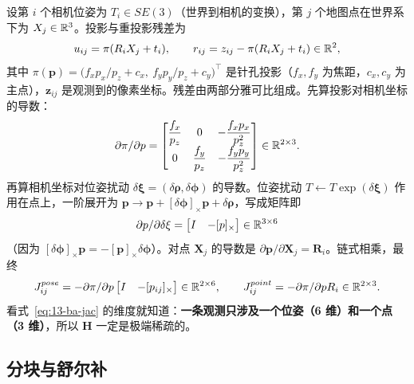 设第 $i$ 个相机位姿为 $T_i\in SE(3)$（世界到相机的变换），第 $j$ 个地图点在世界系下为 $X_j\in\mathbb{R}^{3}$。投影与重投影残差为
\begin{equation}
u_{ij}=\pi(R_iX_j+t_i),\qquad
r_{ij}=z_{ij}-\pi(R_iX_j+t_i)\in\mathbb{R}^{2},
\end{equation}
其中 $\pi(\bm{p})=\big(f_x p_x/p_z+c_x,\ f_y p_y/p_z+c_y\big)^{\top}$ 是针孔投影（$f_x,f_y$ 为焦距，$c_x,c_y$ 为主点），$\bm{z}_{ij}$ 是观测到的像素坐标。残差由两部分雅可比组成。先算投影对相机坐标的导数：
\begin{equation}
\partial\pi/\partial p=\begin{bmatrix}
\dfrac{f_x}{p_z}&0&-\dfrac{f_x p_x}{p_z^{2}}\\[4pt]
0&\dfrac{f_y}{p_z}&-\dfrac{f_y p_y}{p_z^{2}}
\end{bmatrix}\in\mathbb{R}^{2\times3}.
\end{equation}
再算相机坐标对位姿扰动 $\delta\bm{\xi}=(\delta\bm{\rho},\delta\bm{\phi})$ 的导数。位姿扰动 $T\leftarrow T\exp(\delta\bm{\xi})$ 作用在点上，一阶展开为 $\bm{p}\to\bm{p}+[\delta\bm{\phi}]_\times\bm{p}+\delta\bm{\rho}$，写成矩阵即
\begin{equation}
\partial p/\partial\delta\xi=\begin{bmatrix}I&-[p]_\times\end{bmatrix}\in\mathbb{R}^{3\times6}
\end{equation}
（因为 $[\delta\bm{\phi}]_\times\bm{p}=-[\bm{p}]_\times\delta\bm{\phi}$）。对点 $\bm{X}_j$ 的导数是 $\partial\bm{p}/\partial\bm{X}_j=\bm{R}_i$。链式相乘，最终
\begin{equation}
J^{pose}_{ij}=-\partial\pi/\partial p\begin{bmatrix}I&-[p_{ij}]_\times\end{bmatrix}\in\mathbb{R}^{2\times6},
\qquad
J^{point}_{ij}=-\partial\pi/\partial pR_i\in\mathbb{R}^{2\times3}.
\label{eq:13-ba-jac}
\end{equation}
看式~\eqref{eq:13-ba-jac} 的维度就知道：\textbf{一条观测只涉及一个位姿（6 维）和一个点（3 维）}，所以 $\bm{H}$ 一定是极端稀疏的。

\subsection{分块与舒尔补}

